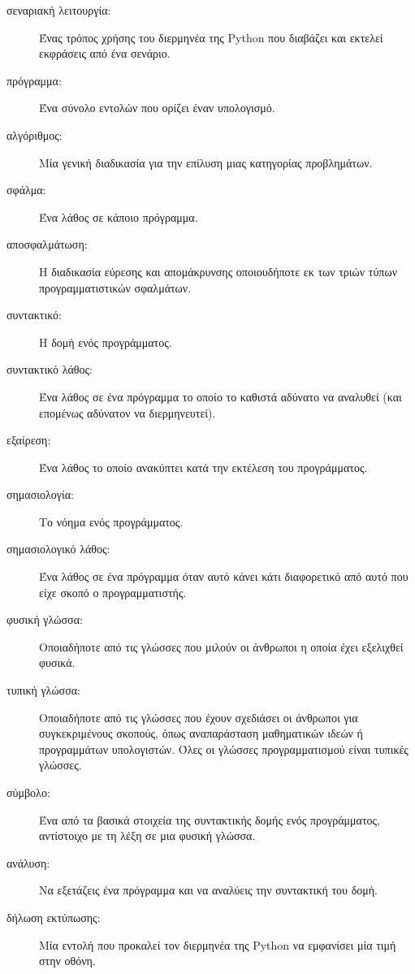 \documentclass[10pt]{book}
\begin{document}
\begin{description}
\item[σεναριακή λειτουργία:] Ένας τρόπος χρήσης του διερμηνέα της 
	Python  που διαβάζει και εκτελεί εκφράσεις από ένα σενάριο.

\item[πρόγραμμα:] Ένα σύνολο εντολών που ορίζει έναν υπολογισμό.

\item[αλγόριθμος:]  Μία γενική διαδικασία για την επίλυση μιας κατηγορίας
	προβλημάτων.

\item[σφάλμα:]  Ένα λάθος σε κάποιο πρόγραμμα.

\item[αποσφαλμάτωση:]  Η διαδικασία εύρεσης και απομάκρυνσης οποιουδήποτε
	εκ των τριών τύπων προγραμματιστικών σφαλμάτων.

\item[συντακτικό:]  Η δομή ενός προγράμματος.

\item[συντακτικό λάθος:]  Ένα λάθος σε ένα πρόγραμμα το οποίο το καθιστά
	αδύνατο να αναλυθεί (και επομένως αδύνατον να διερμηνευτεί).

\item[εξαίρεση:]  Ένα λάθος το οποίο ανακύπτει κατά την εκτέλεση του προγράμματος.

\item[σημασιολογία:]  Το νόημα ενός προγράμματος.

\item[σημασιολογικό λάθος:]   Ένα λάθος σε ένα πρόγραμμα όταν αυτό 
	κάνει κάτι διαφορετικό από αυτό που είχε σκοπό ο προγραμματιστής.

\item[φυσική γλώσσα:]  Οποιαδήποτε από τις γλώσσες που μιλούν οι άνθρωποι
	η οποία έχει εξελιχθεί φυσικά.

\item[τυπική γλώσσα:]  Οποιαδήποτε από τις γλώσσες που έχουν σχεδιάσει
	οι άνθρωποι για συγκεκριμένους σκοπούς, όπως αναπαράσταση μαθηματικών
	ιδεών ή προγραμμάτων υπολογιστών.  Όλες οι γλώσσες προγραμματισμού είναι
	τυπικές γλώσσες.

\item[σύμβολο:]  Ένα από τα βασικά στοιχεία της συντακτικής δομής ενός
	προγράμματος, αντίστοιχο με τη λέξη σε μια φυσική γλώσσα.

\item[ανάλυση:] Να εξετάζεις ένα πρόγραμμα και να αναλύεις την συντακτική
	του δομή.

\item[δήλωση εκτύπωσης:]  Μία εντολή που προκαλεί τον διερμηνέα της 
	Python  να εμφανίσει μία τιμή στην οθόνη.


\end{description}
\end{document}
